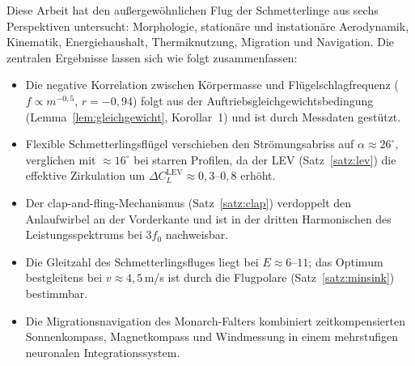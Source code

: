 ﻿\documentclass[a4paper,12pt]{article}
\theoremstyle{definition}
\begin{document}
	Diese Arbeit hat den außergewöhnlichen Flug der Schmetterlinge aus sechs
	Perspektiven untersucht: Morphologie, stationäre und instationäre Aerodynamik,
	Kinematik, Energiehaushalt, Thermiknutzung, Migration und Navigation.
	Die zentralen Ergebnisse lassen sich wie folgt zusammenfassen:
	
	\begin{itemize}
		\item Die negative Korrelation zwischen Körpermasse und Flügelschlagfrequenz
		($f \propto m^{-0{,}5}$, $r = -0{,}94$) folgt aus der
		Auftriebsgleichgewichtsbedingung (Lemma~\ref{lem:gleichgewicht},
		Korollar~1) und ist durch Messdaten gestützt.
		
		\item Flexible Schmetterlingsflügel verschieben den Strömungsabriss auf
		$\alpha \approx 26^\circ$, verglichen mit $\approx 16^\circ$ bei starren
		Profilen, da der LEV (Satz~\ref{satz:lev}) die effektive Zirkulation
		um $\Delta C_L^{\mathrm{LEV}} \approx 0{,}3$--$0{,}8$ erhöht.
		
		\item Der clap-and-fling-Mechanismus (Satz~\ref{satz:clap}) verdoppelt
		den Anlaufwirbel an der Vorderkante und ist in der dritten Harmonischen
		des Leistungsspektrums bei $3f_0$ nachweisbar.
		
		\item Die Gleitzahl des Schmetterlingsfluges liegt bei $E \approx 6$--$11$;
		das Optimum bestgleitens bei $v \approx 4{,}5$\,m/s ist durch die
		Flugpolare (Satz~\ref{satz:minsink}) bestimmbar.
		
		\item Die Migrationsnavigation des Monarch-Falters kombiniert zeitkompensierten
		Sonnenkompass, Magnetkompass und Windmessung in einem mehrstufigen
		neuronalen Integrationssystem.
	\end{itemize}
	
\end{document}
